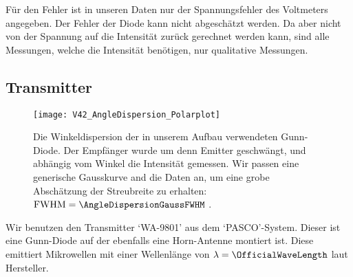 \documentclass[a4paper,10pt,twocolumn]{article}
\begin{document}
    Für den Fehler ist in unseren Daten nur der Spannungsfehler des Voltmeters angegeben.
    Der Fehler der Diode kann nicht abgeschätzt werden.
    Da aber nicht von der Spannung auf die Intensität zurück gerechnet werden kann, sind alle 
    Messungen, welche die Intensität benötigen, nur qualitative Messungen.
    
    \subsection{Transmitter}


    \begin{figure}[htbp]
        \texttt{[image: V42\_AngleDispersion\_Polarplot]}
        \center
        \caption{
            Die Winkeldispersion der in unserem Aufbau verwendeten Gunn-Diode.
        Der Empfänger wurde um denn Emitter geschwängt, und abhängig vom Winkel die Intensität gemessen.
        Wir passen eine generische Gausskurve and die Daten an, um eine grobe Abschätzung der Streubreite zu erhalten:
        $\mathrm{FWHM} = \AngleDispersionGaussFWHM$ . 
        }
        \label{fig:AngleDispersion}
    \end{figure}


    Wir benutzen den Transmitter `WA-9801' aus dem `PASCO'-System.
    Dieser ist eine Gunn-Diode auf der ebenfalls eine Horn-Antenne montiert ist.
    Diese emittiert Mikrowellen mit einer Wellenlänge von $\lambda = \OfficialWaveLength$ laut Hersteller.
    
\end{document}
